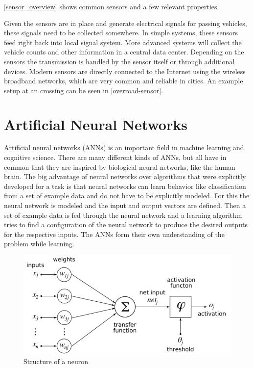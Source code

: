 \autoref{sensor_overview} shows common sensors and a few relevant properties.

Given the sensors are in place and generate electrical signals for passing vehicles, these signals need to be collected somewhere. In simple systems, these sensors feed right back into local signal system. More advanced systems will collect the vehicle counts and other information in a central data center. Depending on the sensors the transmission is handled by the sensor itself or through additional devices. Modern sensors are directly connected to the Internet using the wireless broadband networks, which are very common and reliable in cities. An example setup at an crossing can be seen in \autoref{overroad-sensor}.

\section{Artificial Neural Networks}
\label{sec:ann}

Artificial neural networks (ANNs) is an important field in machine learning and cognitive science. There are many different kinds of ANNs, but all have in common that they are inspired by biological neural networks, like the human brain. The big advantage of neural networks over algorithms that were explicitly developed for a task is that neural networks can learn behavior like classification from a set of example data and do not have to be explicitly modeled. For this the neural network is modeled and the input and output vectors are defined. Then a set of example data is fed through the neural network and a learning algorithm tries to find a configuration of the neural network to produce the desired outputs for the respective inputs. The ANNs form their own understanding of the problem while learning.

\begin{figure}[ht]
	\centering
  \includegraphics[width=15cm]{figures/neuron_structure}
	\caption[Structure of a neuron]{Structure of a neuron \protect\footnotemark}
	\label{neuron}
\end{figure}

